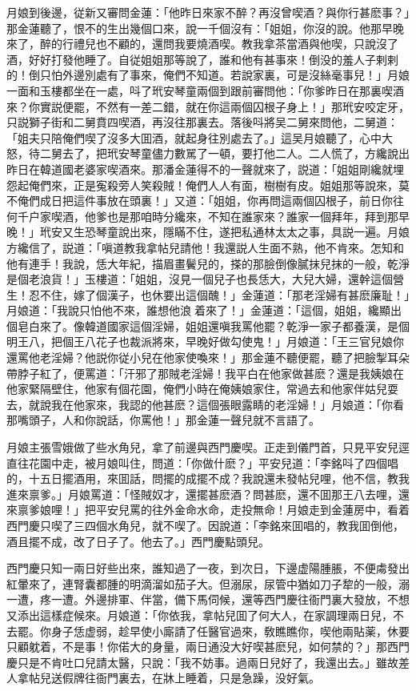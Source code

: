 月娘到後邊，従新又審問金蓮：「他昨日來家不醉？再沒曾喫酒？與你行甚麽事？」那金蓮聽了，恨不的生出幾個口來，說一千個沒有：「姐姐，你沒的說。他那早晚來了，醉的行禮兒也不顧的，還問我要燒酒喫。教我拿茶當酒與他喫，只說沒了酒，好好打發他睡了。自従姐姐那等說了，誰和他有甚事來！倒没的羞人子剌剌的！倒只怕外邊別處有了事來，俺們不知道。若說家裏，可是沒絲毫事兒！」月娘一面和玉樓都坐在一處，呌了玳安琴童兩個到跟前審問他：「你爹昨日在那裏喫酒來？你實説便罷，不然有一差二錯，就在你這兩個囚根子身上！」那玳安咬定牙，只説獅子街和二舅賁四喫酒，再沒往那裏去。落後呌將吴二舅來問他，二舅道：「姐夫只陪俺們喫了沒多大囬酒，就起身往別處去了。」這吴月娘聽了，心中大怒，待二舅去了，把玳安琴童儘力數駡了一頓，要打他二人。二人慌了，方纔說出昨日在韓道國老婆家喫酒來。那潘金蓮得不的一聲就來了，説道：「姐姐剛纔就埋怨起俺們來，正是寃殺旁人笑殺賊！俺們人人有面，樹樹有皮。姐姐那等說來，莫不俺們成日把這件事放在頭裏！」又道：「姐姐，你再問這兩個囚根子，前日你往何千户家喫酒，他爹也是那咱時分纔來，不知在誰家來？誰家一個拜年，拜到那早晚！」玳安又生恐琴童說出來，隱瞞不住，遂把私通林太太之事，具説一遍。月娘方纔信了，説道：「嗔道教我拿帖兒請他！我還説人生面不熟，他不肯來。怎知和他有連手！我說，恁大年紀，描眉畫鬢兒的，搽的那臉倒像膩抹兒抹的一般，乾淨是個老浪貨！」玉樓道：「姐姐，沒見一個兒子也長恁大，大兒大婦，還幹這個營生！忍不住，嫁了個漢子，也休要出這個醜！」金蓮道：「那老淫婦有甚麽廉耻！」月娘道：「我說只怕他不來，誰想他浪𢵞着來了！」金蓮道：「這個，姐姐，纔顯出個皂白來了。像韓道國家這個淫婦，姐姐還嗔我罵他罷？乾淨一家子都養漢，是個明王八，把個王八花子也裁派將來，早晚好做勾使鬼！」月娘道：「王三官兒娘你還罵他老淫婦？他説你従小兒在他家使喚來！」那金蓮不聽便罷，聽了把臉掣耳朵帶脖子紅了，便罵道：「汗邪了那賊老淫婦！我平白在他家做甚麽？還是我姨娘在他家緊隔壁住，他家有個花園，俺們小時在俺姨娘家住，常過去和他家伴姑兒耍去，就說我在他家來，我認的他甚麽？這個張眼露睛的老淫婦！」月娘道：「你看那嘴頭子，人和你說話，你罵他！」那金蓮一聲兒就不言語了。

月娘主張雪娥做了些水角兒，拿了前邊與西門慶喫。正走到儀門首，只見平安兒逕直往花園中走，被月娘叫住，問道：「你做什麽？」平安兒道：「李銘呌了四個唱的，十五日擺酒用，來囬話，問擺的成擺不成？我說還未發帖兒哩，他不信，教我進來禀爹。」月娘罵道：「怪賊奴才，還擺甚麽酒？問甚麽，還不囬那王八去哩，還來禀爹娘哩！」把平安兒罵的往外金命水命，走投無命！月娘走到金蓮房中，看着西門慶只喫了三四個水角兒，就不喫了。因說道：「李銘來囬唱的，教我囬倒他，酒且擺不成，改了日子了。他去了。」西門慶點頭兒。

西門慶只知一兩日好些出來，誰知過了一夜，到次日，下邊虚陽腫脹，不便䖏發出紅暈來了，連腎囊都腫的明滴溜如茄子大。但溺尿，尿管中猶如刀子犂的一般，溺一遭，疼一遭。外邊排軍、伴當，備下馬伺候，還等西門慶往衙門裏大發放，不想又添出這樣症候來。月娘道：「你依我，拿帖兒囬了何大人，在家調理兩日兒，不去罷。你身子恁虚弱，趁早使小廝請了任醫官過來，敎瞧瞧你，喫他兩貼薬，休要只顧躭着，不是事！你偌大的身量，兩日通没大好喫甚麽兒，如何禁的？」那西門慶只是不肯吐口兒請太醫，只說：「我不妨事。過兩日兒好了，我還出去。」雖故差人拿帖兒送假牌往衙門裏去，在牀上睡着，只是急躁，没好氣。

